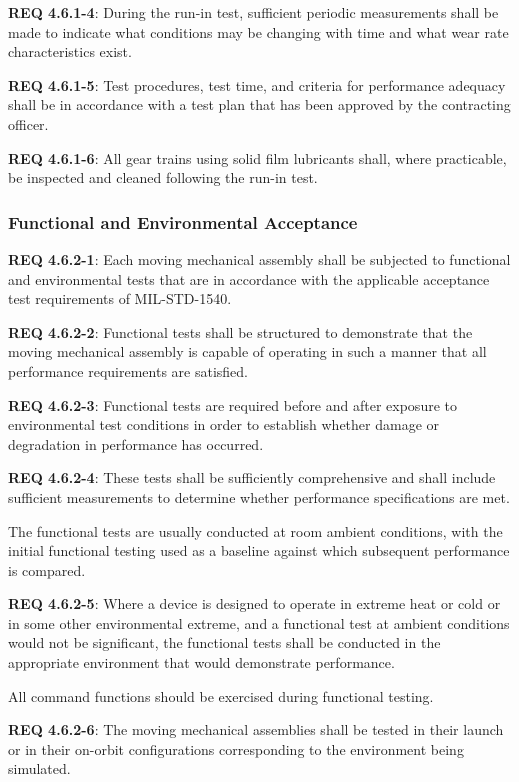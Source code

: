 \documentclass[12pt]{article}
\begin{document}
\noindent \textbf{REQ 4.6.1-4}: During the run-in test, sufficient periodic measurements shall be made to indicate what conditions may be changing with time and what wear rate characteristics exist. 

\noindent \textbf{REQ 4.6.1-5}: Test procedures, test time, and criteria for performance adequacy shall be in accordance with a test plan that has been approved by the contracting officer. 

\noindent \textbf{REQ 4.6.1-6}: All gear trains using solid film lubricants shall, where practicable, be inspected and cleaned following the run-in test.


\subsubsection{Functional and Environmental Acceptance} %
\noindent \textbf{REQ 4.6.2-1}: Each moving mechanical assembly shall be subjected to functional and environmental tests that are in accordance with the applicable acceptance test requirements of MIL-STD-1540. 

\noindent \textbf{REQ 4.6.2-2}: Functional tests shall be structured to demonstrate that the moving mechanical assembly is capable of operating in such a manner that all performance requirements are satisfied. 

\noindent \textbf{REQ 4.6.2-3}: Functional tests are required before and after exposure to environmental test conditions in order to establish whether damage or degradation in performance has occurred. 

\noindent \textbf{REQ 4.6.2-4}: These tests shall be sufficiently comprehensive and shall include sufficient measurements to determine whether performance specifications are met. 

The functional tests are usually conducted at room ambient conditions, with the initial functional testing used as a baseline against which subsequent performance is compared. 

\noindent \textbf{REQ 4.6.2-5}: Where a device is designed to operate in extreme heat or cold or in some other environmental extreme, and a functional test at ambient conditions would not be significant, the functional tests shall be conducted in the appropriate environment that would demonstrate performance. 

All command functions should be exercised during functional testing. 

\noindent \textbf{REQ 4.6.2-6}: The moving mechanical assemblies shall be tested in their launch or in their on-orbit configurations corresponding to the environment being simulated. 
\end{document}
